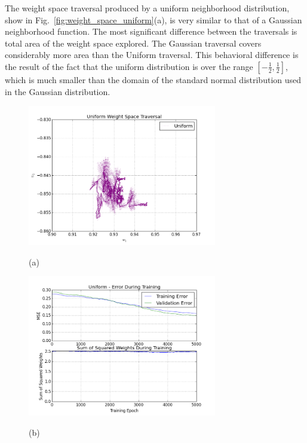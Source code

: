 \documentclass[11pt]{afthesis}
\begin{document}
	The weight space traversal produced by a uniform neighborhood distribution, show in Fig.~\ref{fig:weight_space_uniform}(a), is very similar to that of a Gaussian neighborhood function. The most significant difference between the traversals is total area of the weight space explored. The Gaussian traversal covers considerably more area than the Uniform traversal. This behavioral difference is the result of the fact that the uniform distribution is over the range $\left[ -\frac{1}{2},\frac{1}{2}\right]$, which is much smaller than the domain of the standard normal distribution used in the Gaussian distribution. 
   	\begin{figure}[ht!]
   		
   		\begin{minipage}[b]{0.5\linewidth}
   			\centering
   			\centerline{\includegraphics[width = 3.25in]{figures/weight_space_uniform.png}}
   			\centerline{(a)}\medskip
   		\end{minipage}
   		\hfill
   		\begin{minipage}[b]{0.5\linewidth}
   			\centering
   			\centerline{\includegraphics[width = 3.25in]{figures/weight_space_uniform_perf.png}}
   			\centerline{(b)}\medskip

\end{minipage}
\end{figure}
\end{document}
